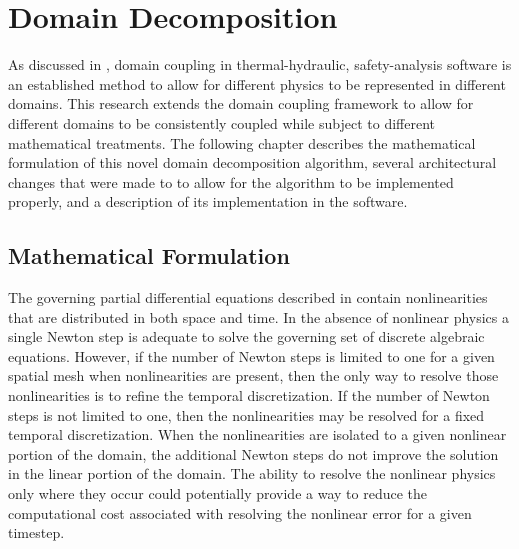 \chapter{Domain Decomposition}
\label{chap:domain_decomposition}
As discussed in , domain coupling in thermal-hydraulic, safety-analysis software is an established method to allow for different physics to be represented in different domains.
This research extends the domain coupling framework to allow for different domains to be consistently coupled while subject to different mathematical treatments.
The following chapter describes the mathematical formulation of this novel domain decomposition algorithm, several architectural changes that were made to \cobra{} to allow for the algorithm to be implemented properly, and a description of its implementation in the software.

\section{Mathematical Formulation}
\label{sec:domDecompMath}

The governing partial differential equations described in  contain nonlinearities that are distributed in both space and time.
In the absence of nonlinear physics a single Newton step is adequate to solve the governing set of discrete algebraic equations.
However, if the number of Newton steps is limited to one for a given spatial mesh when nonlinearities are present, then the only way to resolve those nonlinearities is to refine the temporal discretization.
If the number of Newton steps is not limited to one, then the nonlinearities may be resolved for a fixed temporal discretization.
When the nonlinearities are isolated to a given nonlinear portion of the domain, the additional Newton steps do not improve the solution in the linear portion of the domain.
The ability to resolve the nonlinear physics only where they occur could potentially provide a way to reduce the computational cost associated with resolving the nonlinear error for a given timestep.

